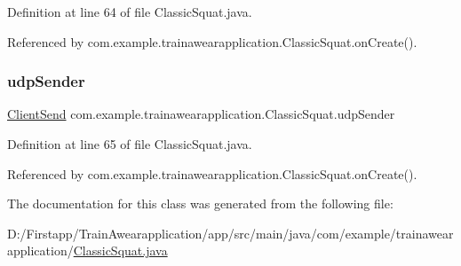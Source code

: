 Definition at line 64 of file Classic\+Squat.\+java.



Referenced by com.\+example.\+trainawearapplication.\+Classic\+Squat.\+on\+Create().

\mbox{\label{classcom_1_1example_1_1trainawearapplication_1_1_classic_squat_af9d9055eef7e92d48f0f544bec3a7abd}} 
\subsubsection{\texorpdfstring{udpSender}{udpSender}}
{\footnotesize\ttfamily \mbox{\hyperlink{classcom_1_1example_1_1trainawearapplication_1_1_client_send}{Client\+Send}} com.\+example.\+trainawearapplication.\+Classic\+Squat.\+udp\+Sender\hspace{0.3cm}{\ttfamily [private]}}



Definition at line 65 of file Classic\+Squat.\+java.



Referenced by com.\+example.\+trainawearapplication.\+Classic\+Squat.\+on\+Create().



The documentation for this class was generated from the following file\+:\begin{DoxyCompactItemize}
\item 
D\+:/\+Firstapp/\+Train\+Awearapplication/app/src/main/java/com/example/trainawearapplication/\mbox{\hyperlink{_classic_squat_8java}{Classic\+Squat.\+java}}\end{DoxyCompactItemize}
